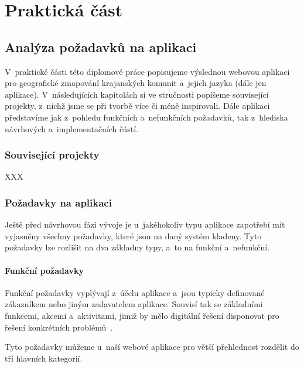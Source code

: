 \part{Praktická část}

\hypertarget{analuxfdza-poux17eadavkux16f-na-aplikaci}{%
\chapter{Analýza požadavků na aplikaci}\label{analuxfdza-poux17eadavkux16f-na-aplikaci}}

V~praktické části této diplomové práce popisujeme výslednou webovou aplikaci pro geografické zmapování krajanských komunit a~jejich jazyka (dále jen aplikace). V~následujících kapitolách si ve stručnosti popíšeme související projekty, z~nichž jsme se při tvorbě více či méně inspirovali. Dále aplikaci představíme jak z~pohledu funkčních a~nefunkčních požadavků, tak z~hlediska návrhových a~implementačních částí.

\hypertarget{souvisejuxedcuxed-projekty}{%
\section{Související projekty}\label{souvisejuxedcuxed-projekty}}

XXX

\hypertarget{poux17eadavky-na-aplikaci}{%
\section{Požadavky na aplikaci}\label{poux17eadavky-na-aplikaci}}

Ještě před návrhovou fází vývoje je u~jakéhokoliv typu aplikace zapotřebí mít vyjasněny všechny požadavky, které jsou na daný systém kladeny. Tyto požadavky lze rozlišit na dva základny typy, a~to na funkční a~nefunkční.

\hypertarget{funkux10dnuxed-poux17eadavky}{%
\subsection{Funkční požadavky}\label{funkux10dnuxed-poux17eadavky}}

Funkční požadavky vyplývají z~účelu aplikace a~jsou typicky definované zákazníkem nebo jiným zadavatelem aplikace. Souvisí tak se základními funkcemi, akcemi a~aktivitami, jimiž by mělo digitální řešení disponovat pro řešení konkrétních problémů~\parencite{Gorton2006}.

Tyto požadavky můžeme u~naší webové aplikace pro větší přehlednost rozdělit do tří hlavních kategorií.

